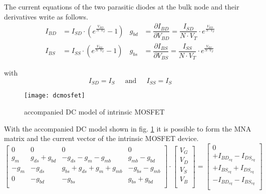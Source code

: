 The current equations of the two parasitic diodes at the bulk node and
their derivatives write as follows.
\begin{align}
I_{BD} &= I_{SD}\cdot \left(e^{\frac{V_{BD}}{N\cdot V_T}} - 1\right) &
g_{bd} &= \dfrac{\partial I_{BD}}{\partial V_{BD}} = \dfrac{I_{SD}}{N\cdot V_T}\cdot e^{\frac{V_{BD}}{N\cdot V_T}}\\
I_{BS} &= I_{SS}\cdot \left(e^{\frac{V_{BS}}{N\cdot V_T}} - 1\right) &
g_{bs} &= \dfrac{\partial I_{BS}}{\partial V_{BS}} = \dfrac{I_{SS}}{N\cdot V_T}\cdot e^{\frac{V_{BS}}{N\cdot V_T}}
\end{align}

with
\begin{equation}
I_{SD} = I_S
\;\;\;\; \textrm{ and } \;\;\;\;
I_{SS} = I_S
\end{equation}

\begin{figure}[ht]
\begin{center}
\texttt{[image: dcmosfet]}
\end{center}
\caption{accompanied DC model of intrinsic MOSFET}
\label{fig:dcmosfet}
\end{figure}
\FloatBarrier

With the accompanied DC model shown in fig. \ref{fig:dcmosfet} it is
possible to form the MNA matrix and the current vector of the
intrinsic MOSFET device.
\begin{equation}
\begin{bmatrix}
0 & 0 & 0 & 0\\
g_{m} & g_{ds} + g_{bd} & -g_{ds} - g_{m} -g_{mb} & g_{mb} - g_{bd}\\
-g_{m} & -g_{ds} & g_{bs} + g_{ds} + g_{m} + g_{mb} & -g_{bs} - g_{mb}\\
0 & -g_{bd} & -g_{bs} & g_{bs} + g_{bd}\\
\end{bmatrix}
\cdot
\begin{bmatrix}
V_{G}\\
V_{D}\\
V_{S}\\
V_{B}\\
\end{bmatrix}
=
\begin{bmatrix}
0\\
+I_{BD_{eq}} - I_{DS_{eq}}\\
+I_{BS_{eq}} + I_{DS_{eq}}\\
-I_{BD_{eq}} - I_{BS_{eq}}\\
\end{bmatrix}
\end{equation}

